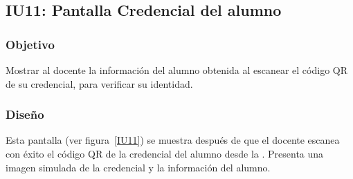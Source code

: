 \subsection{IU11: Pantalla Credencial del alumno}

\newpage

\subsubsection{Objetivo}
Mostrar al docente la información del alumno obtenida al escanear el código QR de su credencial, para verificar su identidad.

\subsubsection{Diseño}
Esta pantalla  (ver figura~\ref{IU11}) se muestra después de que el docente escanea con éxito el código QR de la credencial del alumno desde la . Presenta una imagen simulada de la credencial y la información del alumno.

